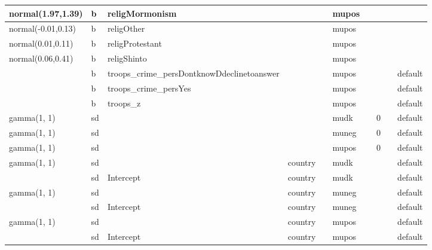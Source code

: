 \documentclass[
]{book}
\theoremstyle{definition}
\theoremstyle{definition}
\theoremstyle{definition}
\theoremstyle{definition}
\theoremstyle{remark}
\begin{document}
\begin{table}
\begin{tabular}[t]{l|l|l|l|l|l|l|l|l|l}
\hline
normal(1.97,1.39) & b & religMormonism &  &  & mupos &  &  &  & \\
\hline
normal(-0.01,0.13) & b & religOther &  &  & mupos &  &  &  & \\
\hline
normal(0.01,0.11) & b & religProtestant &  &  & mupos &  &  &  & \\
\hline
normal(0.06,0.41) & b & religShinto &  &  & mupos &  &  &  & \\
\hline
 & b & troops\_crime\_persDontknowDdeclinetoanswer &  &  & mupos &  &  &  & default\\
\hline
 & b & troops\_crime\_persYes &  &  & mupos &  &  &  & default\\
\hline
 & b & troops\_z &  &  & mupos &  &  &  & default\\
\hline
gamma(1, 1) & sd &  &  &  & mudk &  & 0 &  & default\\
\hline
gamma(1, 1) & sd &  &  &  & muneg &  & 0 &  & default\\
\hline
gamma(1, 1) & sd &  &  &  & mupos &  & 0 &  & default\\
\hline
gamma(1, 1) & sd &  & country &  & mudk &  &  &  & default\\
\hline
 & sd & Intercept & country &  & mudk &  &  &  & default\\
\hline
gamma(1, 1) & sd &  & country &  & muneg &  &  &  & default\\
\hline
 & sd & Intercept & country &  & muneg &  &  &  & default\\
\hline
gamma(1, 1) & sd &  & country &  & mupos &  &  &  & default\\
\hline
 & sd & Intercept & country &  & mupos &  &  &  & default\\
\hline
\end{tabular}
\end{table}
\end{document}
